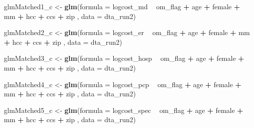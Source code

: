 \documentclass[]{article}
\newenvironment{Shaded}{\begin{snugshade}}{\end{snugshade}}
\newcommand{\KeywordTok}[1]{\textcolor[rgb]{0.13,0.29,0.53}{\textbf{#1}}}
\newcommand{\DataTypeTok}[1]{\textcolor[rgb]{0.13,0.29,0.53}{#1}}
\newcommand{\StringTok}[1]{\textcolor[rgb]{0.31,0.60,0.02}{#1}}
\newcommand{\OperatorTok}[1]{\textcolor[rgb]{0.81,0.36,0.00}{\textbf{#1}}}
\newcommand{\NormalTok}[1]{#1}
\begin{document}
\begin{Shaded}
\begin{Highlighting}[]
\NormalTok{glmMatched1_c <-}\StringTok{ }\KeywordTok{glm}\NormalTok{(}\DataTypeTok{formula =}\NormalTok{ logcost_md }\OperatorTok{~}\StringTok{ }\NormalTok{om_flag }\OperatorTok{+}\StringTok{ }\NormalTok{age }\OperatorTok{+}\StringTok{ }\NormalTok{female }\OperatorTok{+}\StringTok{ }\NormalTok{mm }\OperatorTok{+}\StringTok{ }\NormalTok{hcc }\OperatorTok{+}\StringTok{ }\NormalTok{ccs }\OperatorTok{+}\StringTok{ }\NormalTok{zip ,}
                   \DataTypeTok{data    =}\NormalTok{ dta_run2)}

\NormalTok{glmMatched2_c <-}\StringTok{ }\KeywordTok{glm}\NormalTok{(}\DataTypeTok{formula =}\NormalTok{ logcost_er }\OperatorTok{~}\StringTok{ }\NormalTok{om_flag }\OperatorTok{+}\StringTok{ }\NormalTok{age }\OperatorTok{+}\StringTok{ }\NormalTok{female }\OperatorTok{+}\StringTok{ }\NormalTok{mm }\OperatorTok{+}\StringTok{ }\NormalTok{hcc }\OperatorTok{+}\StringTok{ }\NormalTok{ccs }\OperatorTok{+}\StringTok{ }\NormalTok{zip ,}
                   \DataTypeTok{data    =}\NormalTok{ dta_run2)}

\NormalTok{glmMatched3_c <-}\StringTok{ }\KeywordTok{glm}\NormalTok{(}\DataTypeTok{formula =}\NormalTok{ logcost_hosp }\OperatorTok{~}\StringTok{ }\NormalTok{om_flag }\OperatorTok{+}\StringTok{ }\NormalTok{age }\OperatorTok{+}\StringTok{ }\NormalTok{female }\OperatorTok{+}\StringTok{ }\NormalTok{mm }\OperatorTok{+}\StringTok{ }\NormalTok{hcc }\OperatorTok{+}\StringTok{ }\NormalTok{ccs }\OperatorTok{+}\StringTok{ }\NormalTok{zip ,}
                   \DataTypeTok{data    =}\NormalTok{ dta_run2)}

\NormalTok{glmMatched4_c <-}\StringTok{ }\KeywordTok{glm}\NormalTok{(}\DataTypeTok{formula =}\NormalTok{ logcost_pcp }\OperatorTok{~}\StringTok{ }\NormalTok{om_flag }\OperatorTok{+}\StringTok{ }\NormalTok{age }\OperatorTok{+}\StringTok{ }\NormalTok{female }\OperatorTok{+}\StringTok{ }\NormalTok{mm }\OperatorTok{+}\StringTok{ }\NormalTok{hcc }\OperatorTok{+}\StringTok{ }\NormalTok{ccs }\OperatorTok{+}\StringTok{ }\NormalTok{zip ,}
                   \DataTypeTok{data    =}\NormalTok{ dta_run2)}

\NormalTok{glmMatched5_c <-}\StringTok{ }\KeywordTok{glm}\NormalTok{(}\DataTypeTok{formula =}\NormalTok{ logcost_spec }\OperatorTok{~}\StringTok{ }\NormalTok{om_flag }\OperatorTok{+}\StringTok{ }\NormalTok{age }\OperatorTok{+}\StringTok{ }\NormalTok{female }\OperatorTok{+}\StringTok{ }\NormalTok{mm }\OperatorTok{+}\StringTok{ }\NormalTok{hcc }\OperatorTok{+}\StringTok{ }\NormalTok{ccs }\OperatorTok{+}\StringTok{ }\NormalTok{zip ,}
                   \DataTypeTok{data    =}\NormalTok{ dta_run2)}



\end{Highlighting}
\end{Shaded}
\end{document}
